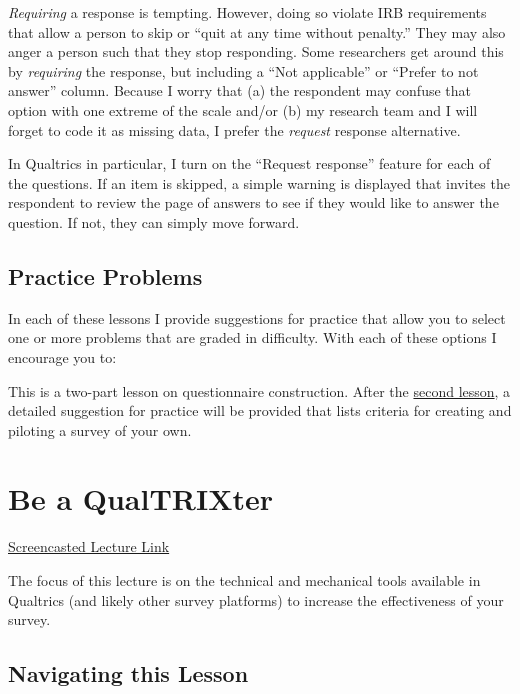 \documentclass[
  english,
]{book}
\begin{document}
\emph{Requiring} a response is tempting. However, doing so violate IRB requirements that allow a person to skip or ``quit at any time without penalty.'' They may also anger a person such that they stop responding. Some researchers get around this by \emph{requiring} the response, but including a ``Not applicable'' or ``Prefer to not answer'' column. Because I worry that (a) the respondent may confuse that option with one extreme of the scale and/or (b) my research team and I will forget to code it as missing data, I prefer the \emph{request} response alternative.

In Qualtrics in particular, I turn on the ``Request response'' feature for each of the questions. If an item is skipped, a simple warning is displayed that invites the respondent to review the page of answers to see if they would like to answer the question. If not, they can simply move forward.

\hypertarget{practice-problems}{%
\section{Practice Problems}\label{practice-problems}}

In each of these lessons I provide suggestions for practice that allow you to select one or more problems that are graded in difficulty. With each of these options I encourage you to:

This is a two-part lesson on questionnaire construction. After the \protect\hyperlink{qualTRIX}{second lesson}, a detailed suggestion for practice will be provided that lists criteria for creating and piloting a survey of your own.

\hypertarget{qualTRIX}{%
\chapter{Be a QualTRIXter}\label{qualTRIX}}

\href{https://spu.hosted.panopto.com/Panopto/Pages/Viewer.aspx?pid=422daef0-a158-48b3-a69d-ad9a00202939}{Screencasted Lecture Link}

The focus of this lecture is on the technical and mechanical tools available in Qualtrics (and likely other survey platforms) to increase the effectiveness of your survey.

\hypertarget{navigating-this-lesson-1}{%
\section{Navigating this Lesson}\label{navigating-this-lesson-1}}
\end{document}
